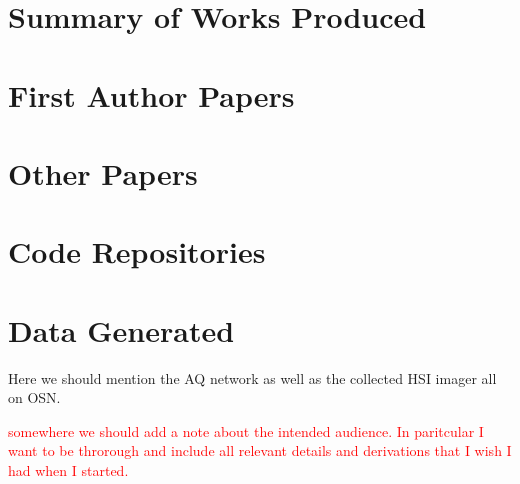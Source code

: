\section{Summary of Works Produced}

\section{First Author Papers}
\section{Other Papers}
\section{Code Repositories}
\section{Data Generated}
Here we should mention the AQ network as well as the collected HSI imager all on OSN.


\textcolor{red}{somewhere we should add a note about the intended audience. In paritcular I want to be throrough and include all relevant details and derivations that I wish I had when I started.}

